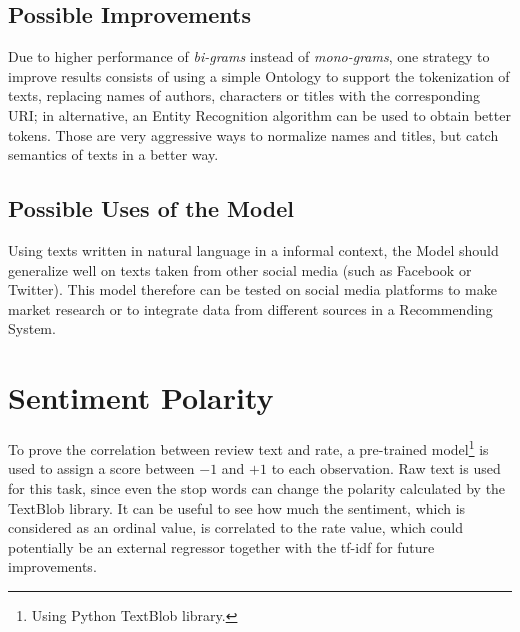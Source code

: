 \documentclass[fleqn,10pt]{SelfArx}
\begin{document}
\subsection{Possible Improvements}
Due to higher performance of \textit{bi-grams} instead of \textit{mono-grams}, one strategy to improve results consists of using a simple Ontology to support the tokenization of texts, replacing names of authors, characters or titles with the corresponding URI; in alternative, an Entity Recognition algorithm can be used to obtain better tokens.
Those are very aggressive ways to normalize names and titles, but catch semantics of texts in a better way.

\subsection{Possible Uses of the Model}
Using texts written in natural language in a informal context, the Model should generalize well on texts taken from other social media (such as Facebook or Twitter).
This model therefore can be tested on social media platforms to make market research or to integrate data from different sources in a Recommending System.


\section{Sentiment Polarity} %
To prove the correlation between review text and rate, a pre-trained model\footnote{Using Python TextBlob library.} is used to assign a score between $-1$ and $+1$ to each observation.
Raw text is used for this task, since even the stop words can change the polarity calculated by the TextBlob library.
It can be useful to see how much the sentiment, which is considered as an ordinal value, is correlated to the rate value, which could potentially be an external regressor together with the tf-idf for future improvements.
\end{document}
